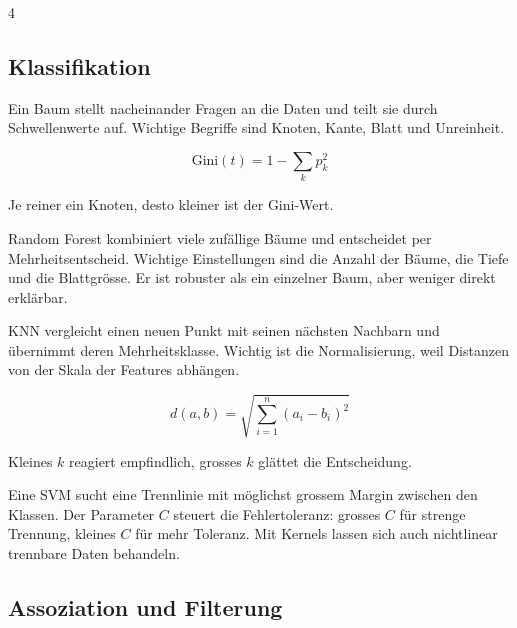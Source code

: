 \begin{landscape}
\begin{multicols*}{4}
        \columnbreak\textcolor{\cheatSheetColor}{\subsection*{Klassifikation}}

        \begin{cheatSheetBox}[title=Entscheidungsbaum]
            Ein Baum stellt nacheinander Fragen an die Daten und teilt sie durch Schwellenwerte auf.
            Wichtige Begriffe sind Knoten, Kante, Blatt und Unreinheit.

            \[
                \text{Gini}(t)=1-\sum_k p_k^2
            \]

            Je reiner ein Knoten, desto kleiner ist der Gini-Wert.
        \end{cheatSheetBox}

        \begin{cheatSheetBox}[title=Random Forest]
            Random Forest kombiniert viele zufällige Bäume und entscheidet per Mehrheitsentscheid.
            Wichtige Einstellungen sind die Anzahl der Bäume, die Tiefe und die Blattgrösse.
            Er ist robuster als ein einzelner Baum, aber weniger direkt erklärbar.
        \end{cheatSheetBox}

        \begin{cheatSheetBox}[title=KNN]
            KNN vergleicht einen neuen Punkt mit seinen nächsten Nachbarn und übernimmt deren Mehrheitsklasse.
            Wichtig ist die Normalisierung, weil Distanzen von der Skala der Features abhängen.

            \[
                d(a,b)=\sqrt{\sum_{i=1}^{n}(a_i-b_i)^2}
            \]

            Kleines $k$ reagiert empfindlich, grosses $k$ glättet die Entscheidung.
        \end{cheatSheetBox}

        \begin{cheatSheetBox}[title=SVM als Bonus]
            Eine SVM sucht eine Trennlinie mit möglichst grossem Margin zwischen den Klassen.
            Der Parameter $C$ steuert die Fehlertoleranz: grosses $C$ für strenge Trennung, kleines $C$ für mehr Toleranz.
            Mit Kernels lassen sich auch nichtlinear trennbare Daten behandeln.
        \end{cheatSheetBox}

        \columnbreak\textcolor{\cheatSheetColor}{\subsection*{Assoziation und Filterung}}


\end{multicols*}
\end{landscape}
